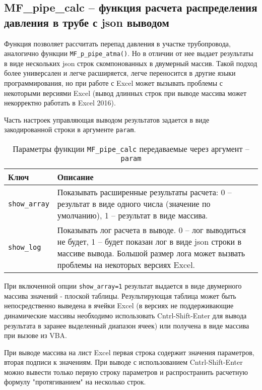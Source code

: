 \subsection{MF\_pipe\_calc – функция расчета распределения давления в трубе с json выводом}  
Функция позволяет рассчитать перепад давления в участке трубопровода, аналогично функции \texttt{MF_p_pipe_atma()}. Но в отличии от нее выдает результаты в виде нескольких json строк скомпонованных в двумерный массив. Такой подход более универсален и легче расширяется, легче переносится в другие языки программирования, но при работе с Excel может вызывать проблемы с некоторыми версиями Excel (вывод длинных строк при выводе массива может некорректно работать в Excel 2016). 


Часть настроек управляющая выводом результатов задается в виде закодированной строки в аргументе \texttt{param}.

\begin{table}[H]
	\caption{Параметры функции \texttt{MF_pipe_calc} передаваемые через аргумент -- \texttt{param}}
	\label{table:param_list_3}
	\begin{tabular}{p{}p{}}
		\hline
		Ключ & Описание  \\ \hline
		\texttt{show_array} & Показывать расширенные результаты расчета: 0 -- результат в виде одного числа (значение по умолчанию), 1 -- результат в виде массива.    \\ \hline
		
		\texttt{show_log} & Показывать лог расчета в выводе. 0 -- лог выводиться не будет, 1 -- будет показан лог в виде json строки в массиве вывода. Большой размер лога может вызвать проблемы на некоторых версиях Excel.   \\ \hline
		
		
	\end{tabular}
\end{table}

При включенной опции \texttt{show_array=1} результат выдается в виде двумерного массива значений - плоской таблицы. Результирующая таблица может быть непосредственно выведена в ячейки Excel (в версиях не поддерживающие динамические массивы необходимо использовать Cntrl-Shift-Enter для вывода результата в заранее выделенный диапазон ячеек) или получена в виде массива при вызове из VBA.

При выводе массива на лист Excel первая строка содержит значения параметров, вторая подписи к значениям. При выводе с использованием Cntrl-Shift-Enter можно вывести только первую строку параметров и распространить расчетную формулу "протягиванием" на несколько строк.

